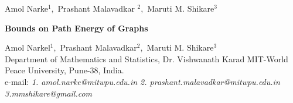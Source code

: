 \documentclass{article}
\newtheorem*{open problem*}{Open Problem}
\begin{document}
	
	\label{'ubf'}  
	\setcounter{page}{1}                                 %
	
	
	{ \centerline                           {\footnotesize \sc  
			Amol Narke$^1,$ Prashant Malavadkar $^2,$ Maruti M. Shikare$^3$                                               } \hspace*{-9mm}              
	}
	
	
	\begin{center}
		{ 
			{\Large \textbf { \sc Bounds on Path Energy of Graphs
				}
			}
			\\
			
			
			\medskip
			
			
			
			
			{\sc Amol Narkel$^1,$ Prashant Malavadkar$^2,$ Maruti M. Shikare$^3$}\\
			{\footnotesize  Department of Mathematics and Statistics, Dr. Vishwanath Karad MIT-World Peace University, Pune-38, India. }\\
			{\footnotesize e-mail: {\it 1. amol.narke@mitwpu.edu.in 2. prashant.malavadkar@mitwpu.edu.in 3.mmshikare@gmail.com }}
		}
	\end{center}
	
	
	\thispagestyle{empty}
	
	
	\hrulefill
	
	
	\begin{abstract}  
		{\footnotesize 
			Given a graph $M,$ path eigenvalues are eigenvalues of its path matrix. The path energy of a simple graph $M$ is equal to the sum of the absolute values of the path eigenvalues of the graph $M$ (Shikare et. al, 2018). We have discovered new upper constraints on path energy in this study, expressed in terms of a graph's maximum degree. Additionally, a relationship between a graph's energy and path energy is given.}
		\end{abstract}
		\hrulefill
		
\end{document}
